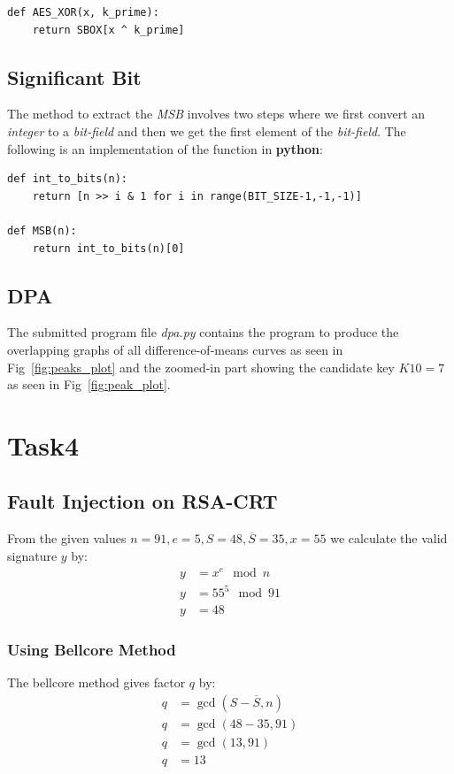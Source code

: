 \documentclass[1p,16pt]{elsarticle}
\begin{document}
\begin{verbatim}
def AES_XOR(x, k_prime):
    return SBOX[x ^ k_prime]
\end{verbatim}

\subsection{Significant Bit}%
\label{sub:significant_bit}
The method to extract the \textit{MSB} involves two steps where we first convert an \textit{integer}
to a \textit{bit-field} and then we get the first element of the \textit{bit-field}.
The following is an implementation of the function in \textbf{python}:
\begin{verbatim}
def int_to_bits(n):
    return [n >> i & 1 for i in range(BIT_SIZE-1,-1,-1)]

def MSB(n):
    return int_to_bits(n)[0]
\end{verbatim}

\subsection{DPA}%
\label{sub:dpa}
The submitted program file \textit{dpa.py} contains the program to produce the overlapping graphs
of all difference-of-means curves as seen in Fig~\ref{fig:peaks_plot} and the zoomed-in part
showing the candidate key $K10=7$ as seen in Fig~\ref{fig:peak_plot}.



\section{Task4}

\subsection{Fault Injection on RSA-CRT}%
\label{sub:fault_injection_on_rsa_crt}
From the given values
$n=91, e=5, S=48, \overline{S}=35, x=55$
we calculate the valid signature $y$ by:
\begin{align}
	y &= x^e \mod n \\
	y &= 55^5 \mod 91 \\
	y & = 48
\end{align}

\subsubsection{Using Bellcore Method}%
\label{sub:ballcore_method}
The bellcore method gives factor $q$ by:
\begin{align}
	q &= \gcd(S - \overline{S}, n) \\
	q &= \gcd(48 - 35, 91) \\
	q &= \gcd(13, 91) \\
	q &= 13
\end{align}
\end{document}

